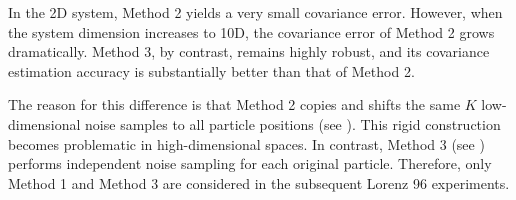 In the 2D system, Method 2 yields a very small covariance error. However, when the system dimension increases to 10D, the covariance error of Method 2 grows dramatically. Method 3, by contrast, remains highly robust, and its covariance estimation accuracy is substantially better than that of Method 2.

The reason for this difference is that Method 2 copies and shifts the same $K$ low-dimensional noise samples to all particle positions (see ). This rigid construction becomes problematic in high-dimensional spaces. In contrast, Method 3 (see ) performs independent noise sampling for each original particle. Therefore, only Method 1 and Method 3 are considered in the subsequent Lorenz 96 experiments.